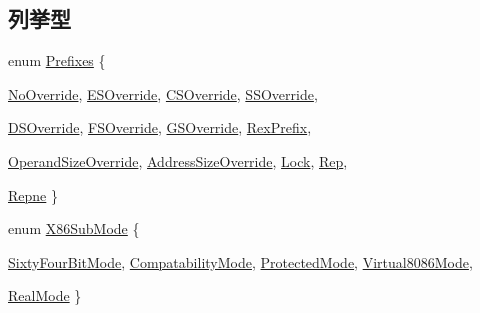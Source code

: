\subsection*{列挙型}
\begin{DoxyCompactItemize}
\item 
enum \hyperlink{namespaceX86ISA_a9177933bdde69fdb102a2316ae38b2a3}{Prefixes} \{ \par
\hyperlink{namespaceX86ISA_a9177933bdde69fdb102a2316ae38b2a3af9fec9b4f7d51b7248df7ce3a85c60f1}{NoOverride}, 
\hyperlink{namespaceX86ISA_a9177933bdde69fdb102a2316ae38b2a3ae0124c17eb50a05dc56fed5e45ef749b}{ESOverride}, 
\hyperlink{namespaceX86ISA_a9177933bdde69fdb102a2316ae38b2a3af92ca81d3fb5a7a5f54434b0e9123681}{CSOverride}, 
\hyperlink{namespaceX86ISA_a9177933bdde69fdb102a2316ae38b2a3a391a6565a850313cbb7566b6d9f1d551}{SSOverride}, 
\par
\hyperlink{namespaceX86ISA_a9177933bdde69fdb102a2316ae38b2a3a1448f195560880a9871ab76bf82d9b3c}{DSOverride}, 
\hyperlink{namespaceX86ISA_a9177933bdde69fdb102a2316ae38b2a3a21c2d3faff93fc0b2e2298d4692be27e}{FSOverride}, 
\hyperlink{namespaceX86ISA_a9177933bdde69fdb102a2316ae38b2a3a5d7923c8d53cd9bc464f0d8f576e0265}{GSOverride}, 
\hyperlink{namespaceX86ISA_a9177933bdde69fdb102a2316ae38b2a3aa7a35144e4b4c598335e0f7402de72ce}{RexPrefix}, 
\par
\hyperlink{namespaceX86ISA_a9177933bdde69fdb102a2316ae38b2a3a4e92c23a3b508ce9328542e9fae4173c}{OperandSizeOverride}, 
\hyperlink{namespaceX86ISA_a9177933bdde69fdb102a2316ae38b2a3a3579abb9a5dc8f35b695f066644a6dc9}{AddressSizeOverride}, 
\hyperlink{namespaceX86ISA_a9177933bdde69fdb102a2316ae38b2a3a2d2c1d495d2836c20c94c46758ddb504}{Lock}, 
\hyperlink{namespaceX86ISA_a9177933bdde69fdb102a2316ae38b2a3a22190dd5b4be7579433dde57c66255fb}{Rep}, 
\par
\hyperlink{namespaceX86ISA_a9177933bdde69fdb102a2316ae38b2a3af518a987ca2bc3daad03f1a8bd579ae7}{Repne}
 \}
\item 
enum \hyperlink{namespaceX86ISA_a88701044b173f3a3f9c0d8b09e63eb1b}{X86SubMode} \{ \par
\hyperlink{namespaceX86ISA_a88701044b173f3a3f9c0d8b09e63eb1baf4b5a2e57762ba0a4b89a8f5dacbbf5b}{SixtyFourBitMode}, 
\hyperlink{namespaceX86ISA_a88701044b173f3a3f9c0d8b09e63eb1ba2b4096cd762e2849d1c0254e79313b8e}{CompatabilityMode}, 
\hyperlink{namespaceX86ISA_a88701044b173f3a3f9c0d8b09e63eb1ba82b7974f109f673e8bc6e1783bceae29}{ProtectedMode}, 
\hyperlink{namespaceX86ISA_a88701044b173f3a3f9c0d8b09e63eb1ba706a613113c9410e8f12261fcc3c843a}{Virtual8086Mode}, 
\par
\hyperlink{namespaceX86ISA_a88701044b173f3a3f9c0d8b09e63eb1bab71c470637aa9786a0b0c8cef9c68552}{RealMode}
 \}
\end{DoxyCompactItemize}
